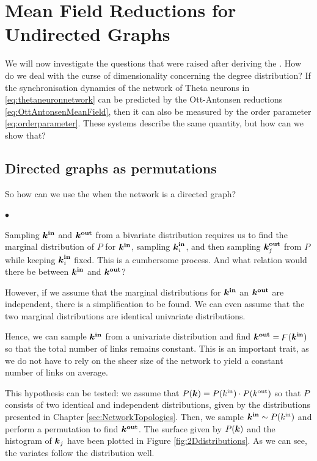 \newpage
\section{\mywork Mean Field Reductions for Undirected Graphs} \label{sec:MFRSUndirected}
We will now investigate the questions that were raised after deriving the \MFR. How do we deal with the curse of dimensionality concerning the degree distribution? If the synchronisation dynamics of the network of Theta neurons in \eqref{eq:thetaneuronnetwork} can be predicted by the Ott-Antonsen reductions \eqref{eq:OttAntonsenMeanField}, then it can also be measured by the order parameter \eqref{eq:orderparameter}. These systems describe the same quantity, but how can we show that?


\subsection{Directed graphs as permutations}
So how can we use the \MFR when the network is a directed graph?
\begin{list}{$\bullet$}{}  
\item Sampling ${\boldsymbol{k^{\rm in}}}$ and $\boldsymbol{{k^{\rm out}}}$ from a bivariate distribution requires us to find the marginal distribution of $P$ for ${\boldsymbol{k^{\rm in}}}$, sampling ${\boldsymbol{k}_i^{\bf in}}$, and then sampling ${\boldsymbol{k}_j^{\bf out}}$ from $P$ while keeping ${\boldsymbol{k}_i^{\bf in}}$ fixed. This is a cumbersome process. And what relation would there be between ${\boldsymbol{k^{\rm in}}}$ and $\boldsymbol{{k^{\rm out}}}$?
\item However, if we assume that the marginal distributions for ${\boldsymbol{k^{\rm in}}}$ an $\boldsymbol{{k^{\rm out}}}$ are independent, there is a simplification to be found. We can even assume that the two marginal distributions are identical univariate distributions. 
\item Hence, we can sample ${\boldsymbol{k^{\rm in}}}$ from a univariate distribution and find $\boldsymbol{{k^{\rm out}}} = {\digamma} ( {\boldsymbol{k^{\rm in}}} )$ so that the total number of links remains constant. This is an important trait, as we do not have to rely on the sheer size of the network to yield a constant number of links on average.
\end{list}

This hypothesis can be tested: we assume that $P({\boldsymbol{k}}) = P({k^{\rm in}}) \cdot P({k^{\rm out}})$ so that $P$ consists of two identical and independent distributions, given by the distributions presented in Chapter \ref{sec:NetworkTopologies}. Then, we sample ${\boldsymbol{k^{\rm in}}} \sim P({k^{\rm in}})$ and perform a permutation to find $\boldsymbol{{k^{\rm out}}}$. The surface given by $P({\boldsymbol{k}})$ and the histogram of ${\boldsymbol{k}}_j$ have been plotted in Figure \ref{fig:2Ddistributions}. As we can see, the variates follow the distribution well. 

